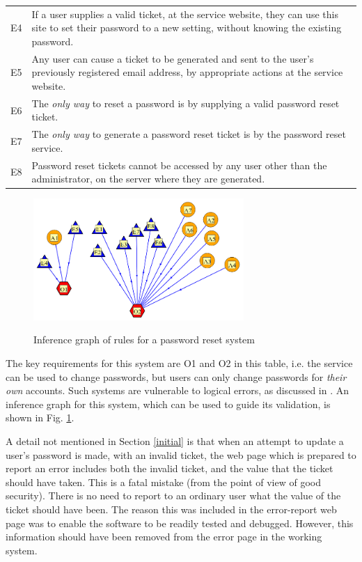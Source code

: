 \begin{table}[tb]
\begin{center}
\begin{tabular}{|c|p{6cm}|}
E4 & If a user supplies a valid ticket, at the service website, they can use this site to set their password to 
a new setting, without knowing the existing password.\\
E5 & Any user can cause a ticket to be generated and sent to the user's previously registered email address, by 
appropriate actions at the service website.\\
E6 & The {\em only way} to reset a password is by supplying a valid password reset ticket.\\
E7 & The {\em only way} to generate a password reset ticket is by the password
reset service.\\
E8 & Password reset tickets cannot be accessed by any user other than the administrator, on the server
where they are generated.\\
\hline
\end{tabular}
\end{center}
\end{table}

\begin{figure}[bhpt]
	\begin{centering}
		\leavevmode\includegraphics[width=8cm]{figures/pwreset.png}\ \\
		\caption{Inference graph of rules for a password reset system}\label{pwresetrules}
	\end{centering}
\end{figure}

The key requirements for this system are O1 and O2 in this table, i.e. the service can be used to change passwords, but users can only change passwords for {\em their own} accounts. Such systems are vulnerable to logical errors, as discussed in \cite{exptsandproofs}. An inference graph for this system, which can be used to guide its validation, is shown in Fig. \ref{pwresetrules}.


\iffalse
A detail not mentioned in Section \ref{initial} is that when an attempt
to update a user's password is made, with an invalid ticket, the web 
page which is prepared to report an error includes both the invalid
ticket, and the value that the ticket should have taken. This is a fatal
mistake (from the point of view of good security). There is no need
to report to an ordinary user what the value of the ticket should
have been. The reason this was included in the error-report web page
was to enable the software to be readily tested and debugged. However,
this information should have been removed from the error page
in the working system.

